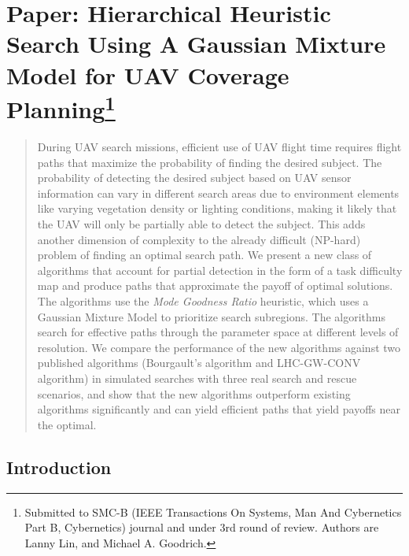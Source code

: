 \chapter[Paper: Hierarchical Heuristic Search Using A Gaussian Mixture Model for UAV Coverage Planning]{Paper: Hierarchical Heuristic Search Using A Gaussian Mixture Model for UAV Coverage Planning\footnote {Submitted to SMC-B (IEEE Transactions On Systems, Man And Cybernetics Part B, Cybernetics) journal and under 3rd round of review. Authors are Lanny Lin, and Michael A. Goodrich.}}
\label{chap:SMCB2014}

\begin{abstract}
During UAV search missions, efficient use of UAV flight time requires flight paths that maximize the probability of finding the desired subject. The probability of detecting the desired subject based on UAV sensor information can vary in different search areas due to environment elements like varying vegetation density or lighting conditions, making it likely that the UAV will only be partially able to detect the subject. This adds another dimension of complexity to the already difficult (NP-hard) problem of finding an optimal search path. We present a new class of algorithms that account for partial detection in the form of a task difficulty map and produce paths that approximate the payoff of optimal solutions. The algorithms use the \textit{Mode Goodness Ratio} heuristic, which uses a Gaussian Mixture Model to prioritize search subregions. The algorithms search for effective paths through the parameter space at different levels of resolution. We compare the performance of the new algorithms against two published algorithms (Bourgault's algorithm and LHC-GW-CONV algorithm) in simulated searches with three real search and rescue scenarios, and show that the new algorithms outperform existing algorithms significantly and can yield efficient paths that yield payoffs near the optimal.  
\end{abstract}


%

\section{Introduction}
\label{sec:Introduction}


